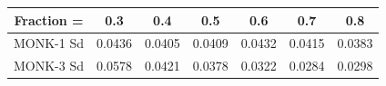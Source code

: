 \documentclass{article}
\begin{document}
\begin{center}
 \begin{tabular}{|c c c c c c c|} 
 \hline
 Fraction = & 0.3 & 0.4 & 0.5 & 0.6 & 0.7 & 0.8  \\ [0.5ex] 
 \hline 
 MONK-1 Sd \vline & 0.0436 & 0.0405 & 0.0409 & 0.0432 & 0.0415 & 0.0383 \\ 
 \hline
 MONK-3 Sd  \vline & 0.0578 & 0.0421 & 0.0378 & 0.0322 & 0.0284 & 0.0298 \\ [1ex] 
 \hline
\end{tabular}
\end{center}
\end{document}
